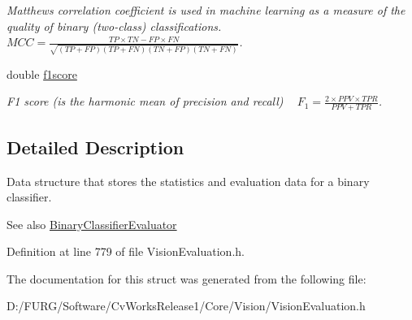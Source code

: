\begin{DoxyCompactItemize}
\begin{DoxyCompactList}\small\item\em Matthews correlation coefficient is used in machine learning as a measure of the quality of binary (two-\/class) classifications. ~\newline
 $ MCC = \frac{TP \times TN - FP \times FN}{\sqrt{(TP+FP)(TP+FN)(TN+FP)(TN+FN)}} $. \end{DoxyCompactList}\item 
\hypertarget{struct_vision_core_1_1_evaluation_1_1_binary_classifier_eval_result_ac8bfb2aa00ec18131ea1b1f9383a8c8f}{}double \hyperlink{struct_vision_core_1_1_evaluation_1_1_binary_classifier_eval_result_ac8bfb2aa00ec18131ea1b1f9383a8c8f}{f1score}\label{struct_vision_core_1_1_evaluation_1_1_binary_classifier_eval_result_ac8bfb2aa00ec18131ea1b1f9383a8c8f}

\begin{DoxyCompactList}\small\item\em F1 score (is the harmonic mean of precision and recall) ~\newline
 $ F_{1} = \frac{2 \times PPV \times TPR}{PPV + TPR} $. \end{DoxyCompactList}\end{DoxyCompactItemize}


\subsection{Detailed Description}
Data structure that stores the statistics and evaluation data for a binary classifier. 

\begin{DoxySeeAlso}{See also}
\hyperlink{class_vision_core_1_1_evaluation_1_1_binary_classifier_evaluator}{Binary\+Classifier\+Evaluator} 
\end{DoxySeeAlso}


Definition at line 779 of file Vision\+Evaluation.\+h.



The documentation for this struct was generated from the following file\+:\begin{DoxyCompactItemize}
\item 
D\+:/\+F\+U\+R\+G/\+Software/\+Cv\+Works\+Release1/\+Core/\+Vision/Vision\+Evaluation.\+h\end{DoxyCompactItemize}
